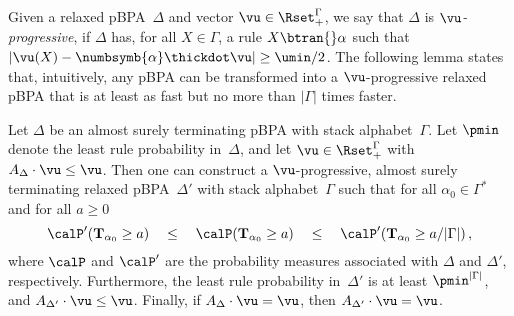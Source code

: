 Given a relaxed pBPA~$\Delta$ and vector $\vu \in \Rset_+^\Gamma$,
 we say that $\Delta$ is {\em $\vu$-progressive}, if $\Delta$ has, for all $X \in \Gamma$,
 a rule $X \btran{} \alpha$ such that $|\vu(X) - \numbsymb{\alpha} \thickdot \vu| \ge \umin/2$.
The following lemma states that, intuitively, any pBPA can be transformed into a $\vu$-progressive relaxed pBPA
 that is at least as fast but no more than ${|\Gamma|}$ times faster.
\begin{lemma} \label{lem:progressive}
 Let $\Delta$ be an almost surely terminating pBPA with stack alphabet~$\Gamma$.
 Let $\pmin$ denote the least rule probability in~$\Delta$, and let $\vu \in \Rset_+^\Gamma$ with $A_\Delta \cdot \vu \le \vu$.
 Then one can construct a $\vu$-progressive, almost surely terminating relaxed pBPA~$\Delta'$
  with stack alphabet~$\Gamma$ such that for all $\alpha_0\in\Gamma^*$ and for all $a \ge 0$
 \[
  \calP'(\mathbf{T}_{\alpha_0} \ge a) \quad \le \quad \calP( \mathbf{T}_{\alpha_0} \ge a ) \quad \le \quad \calP'(\mathbf{T}_{\alpha_0} \ge a / |\Gamma|)\,,
 \]
 where $\calP$ and $\calP'$ are the probability measures associated with $\Delta$ and $\Delta'$, respectively.
 Furthermore, the least rule probability in~$\Delta'$ is at least $\pmin^{|\Gamma|}$, and $A_{\Delta'} \cdot \vu \le \vu$.
 Finally, if $A_\Delta \cdot \vu = \vu$, then $A_{\Delta'} \cdot \vu = \vu$.
\end{lemma}
